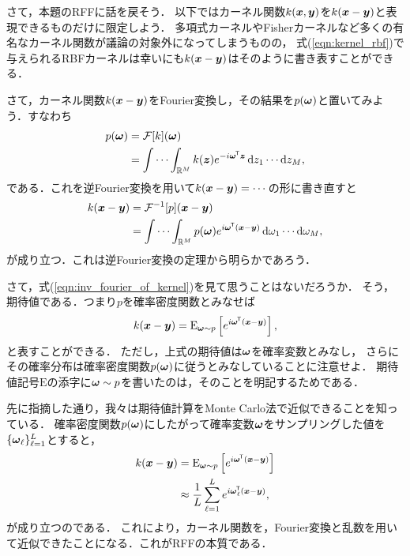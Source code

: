 さて，本題のRFFに話を戻そう．
以下ではカーネル関数$k(\boldsymbol{x}, \boldsymbol{y})$を$k(\boldsymbol{x} - \boldsymbol{y})$と表現できるものだけに限定しよう．
多項式カーネルやFisherカーネルなど多くの有名なカーネル関数が議論の対象外になってしまうものの，
式(\ref{eqn:kernel_rbf})で与えられるRBFカーネルは幸いにも$k(\boldsymbol{x} - \boldsymbol{y})$はそのように書き表すことができる．

さて，カーネル関数$k(\boldsymbol{x} - \boldsymbol{y})$をFourier変換し，その結果を$p(\boldsymbol{\omega})$と置いてみよう．すなわち
\begin{align}
    p(\boldsymbol{\omega})
    &= \mathcal{F} [k](\boldsymbol{\omega}) \notag \\
    &= \idotsint_{\mathbb{R}^M} k(\boldsymbol{z}) e^{-i\boldsymbol{\omega}^{\mkern-1.5mu\mathsf{T}}\boldsymbol{z}} \, \mathrm{d}z_1 \cdots \mathrm{d}z_M,
    \label{eqn:fourier_of_kernel}
\end{align}
である．これを逆Fourier変換を用いて$k(\boldsymbol{x} - \boldsymbol{y}) = \cdots$の形に書き直すと
\begin{align}
    k(\boldsymbol{x} - \boldsymbol{y})
    &= \mathcal{F}^{-1} [p](\boldsymbol{x} - \boldsymbol{y}) \notag \\
    &= \idotsint_{\mathbb{R}^M} p(\boldsymbol{\omega}) e^{i\boldsymbol{\omega}^{\mkern-1.5mu\mathsf{T}}(\boldsymbol{x} - \boldsymbol{y})} \, \mathrm{d}\omega_1 \cdots \mathrm{d}\omega_M,
    \label{eqn:inv_fourier_of_kernel}
\end{align}
が成り立つ．これは逆Fourier変換の定理から明らかであろう．

さて，式(\ref{eqn:inv_fourier_of_kernel})を見て思うことはないだろうか．
そう，期待値である．つまり$p$を確率密度関数とみなせば
\begin{equation}
    k(\boldsymbol{x} - \boldsymbol{y}) = \mathrm{E}_{\boldsymbol{\omega} \sim p} \left[ e^{i\boldsymbol{\omega}^{\mkern-1.5mu\mathsf{T}}(\boldsymbol{x} - \boldsymbol{y})} \right],
    \label{eqn:rff_expectation}
\end{equation}
と表すことができる．
ただし，上式の期待値は$\boldsymbol{\omega}$を確率変数とみなし，
さらにその確率分布は確率密度関数$p(\boldsymbol{\omega})$に従うとみなしていることに注意せよ．
期待値記号$\mathrm{E}$の添字に${\boldsymbol{\omega} \sim p}$を書いたのは，そのことを明記するためである．

先に指摘した通り，我々は期待値計算をMonte Carlo法で近似できることを知っている．
確率密度関数$p(\boldsymbol{\omega})$にしたがって確率変数$\boldsymbol{\omega}$をサンプリングした値を
$\{\boldsymbol{\omega}_\ell\}_{\ell=1}^{L}$とすると，
\begin{align}
    k(\boldsymbol{x} - \boldsymbol{y})
    &= \mathrm{E}_{\boldsymbol{\omega} \sim p} \left[ e^{i\boldsymbol{\omega}^{\mkern-1.5mu\mathsf{T}}(\boldsymbol{x} - \boldsymbol{y})} \right]
    \notag \\
    &\approx \frac{1}{L} \sum_{\ell = 1}^{L} e^{i\boldsymbol{\omega}_\ell^{\mkern-1.5mu\mathsf{T}}(\boldsymbol{x} - \boldsymbol{y})},
    \label{eqn:rff_approx}
\end{align}
が成り立つのである．
これにより，カーネル関数を，Fourier変換と乱数を用いて近似できたことになる．これがRFFの本質である．

